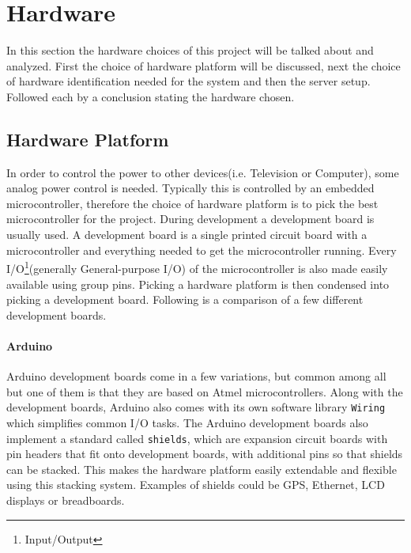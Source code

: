 \chapter{Hardware}
\label{chap:hardware}
In this section the hardware choices of this project will be talked about and analyzed. First the choice of hardware platform will be discussed, next the choice of hardware identification needed for the system and then the server setup. Followed each by a conclusion stating the hardware chosen.

\section{Hardware Platform}
In order to control the power to other devices(i.e. Television or Computer), some analog power control is needed. Typically this is controlled by an embedded microcontroller, therefore the choice of hardware platform is to pick the best microcontroller for the project. During development a development board is usually used. A development board is a single printed circuit board with a microcontroller and everything needed to get the microcontroller running. Every I/O\footnote{Input/Output}(generally General-purpose I/O) of the microcontroller is also made easily available using group pins. Picking a hardware platform is then condensed into picking a development board. Following is a comparison of a few different development boards.

\subsubsection{Arduino}
Arduino development boards come in a few variations, but common among all but one of them is that they are based on Atmel microcontrollers. Along with the development boards, Arduino also comes with its own software library \texttt{Wiring} which simplifies common I/O tasks. The Arduino development boards also implement a standard called \texttt{shields}, which are expansion circuit boards with pin headers that fit onto development boards, with additional pins so that shields can be stacked. This makes the hardware platform easily extendable and flexible using this stacking system. Examples of shields could be GPS, Ethernet, LCD displays or breadboards.


